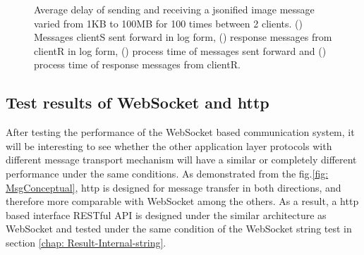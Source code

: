 \begin{figure}[htb]
    \caption{Average delay of sending and receiving a jsonified image message varied from 1KB 
    to 100MB for 100 times between 2 clients. () 
    Messages clientS sent forward in log form, 
    () response messages from clientR in log form, 
    () process time of messages sent forward  
    and () process time of response messages from clientR. 
    \label{fig: proportional-imagesize}}
\end{figure}


\subsection{Test results of WebSocket and \gls{http}} \label{chap: Result-RestFUL_WS}
After testing the performance of the WebSocket based communication system, 
it will be interesting to see whether the other application layer protocols with 
different message transport mechanism will have a similar or completely different 
performance under the same conditions. As demonstrated from the 
fig.\ref{fig: MsgConceptual}, \gls{http} is designed for message 
transfer in both directions, and therefore more comparable with WebSocket among the others. 
As a result, a \gls{http} based interface RESTful API is designed under the similar architecture 
as WebSocket and tested under the same condition of the WebSocket string test in 
section \ref{chap: Result-Internal-string}.





